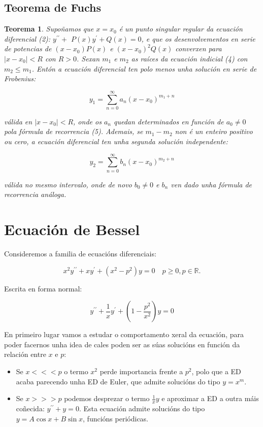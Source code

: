 \documentclass[a4paper,12pt,titlepage]{article}
\newtheorem{theorem}{Teorema}
\begin{document}
\subsection{Teorema de Fuchs}

\begin{theorem}
    Supoñamos que $x=x_{0}$ é un punto singular regular da ecuación diferencial (2): $y^{\prime \prime}+$ $P(x) y^{\prime}+Q(x)=0$, e que os desenvolvementos en serie de potencias de $\left(x-x_{0}\right) P(x)$ e $\left(x-x_{0}\right)^{2} Q(x)$ converxen para $\left|x-x_{0}\right|<R$ con $R>0$. Sexan $m_{1}$ e $m_{2}$ as raíces da ecuación indicial (4) con $m_{2} \leq m_{1}$. Entón a ecuación diferencial ten polo menos unha solución en serie de Frobenius:

$$
y_{1}=\sum_{n=0}^{\infty} a_{n}\left(x-x_{0}\right)^{m_{1}+n}
$$

válida en $\left|x-x_{0}\right|<R$, onde os $a_{n}$ quedan determinados en función de $a_{0} \neq 0$ pola fórmula de recorrencia (5). Ademais, se $m_{1}-m_{2}$ non é un enteiro positivo ou cero, a ecuación diferencial ten unha segunda solución independente:

$$
y_{2}=\sum_{n=0}^{\infty} b_{n}\left(x-x_{0}\right)^{m_{2}+n}
$$

válida no mesmo intervalo, onde de novo $b_{0} \neq 0$ e $b_{n}$ ven dado unha fórmula de recorrencia análoga.
\end{theorem}

\section{Ecuación de Bessel}

Consideremos a familia de ecuacións diferenciais:

$$
x^{2} y^{\prime \prime}+x y^{\prime}+\left(x^{2}-p^{2}\right) y=0 \quad p \geq 0, p \in \mathbb{R} .
$$

Escrita en forma normal:

$$
y^{\prime \prime} + \frac{1}{x} y^{\prime} + \left (1-\frac{p^2}{x^2}\right ) y = 0
$$

En primeiro lugar vamos a estudar o comportamento xeral da ecuación, para poder facernos unha idea de cales poden ser as súas solucións en función da relación entre $x$ e $p$:

\begin{itemize}
    \item Se $x<<<p$ o termo $x^2$ perde importancia frente a $p^2$, polo que a ED acaba parecendo unha ED de Euler, que admite solucións do tipo $y=x^m$.
    \item Se $x>>>p$ podemos desprezar o termo $\frac{1}{x}y$ e aproximar a ED a outra máis coñecida: $y^{\prime \prime} + y =0$. Esta ecuación admite solucións do tipo $y=A\cos x + B\sin x$, funcións periódicas.
\end{itemize}
\end{document}
